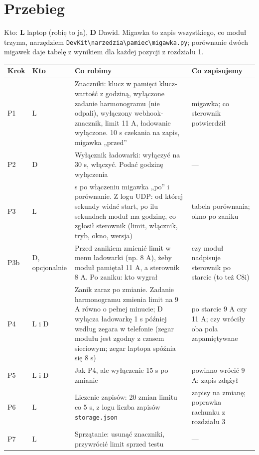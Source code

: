 \documentclass[11pt,a4paper]{article}
\begin{document}
\section*{Przebieg}

Kto: \textbf{L} laptop (robię to ja), \textbf{D} Dawid. Migawka to zapis wszystkiego, co moduł trzyma, narzędziem \texttt{DevKit\textbackslash{}narzedzia\textbackslash{}pamiec\textbackslash{}migawka.\allowbreak{}py}; porównanie dwóch migawek daje tabelę z wynikiem dla każdej pozycji z rozdziału 1.


\begin{longtable}{>{\raggedright\arraybackslash}p{3.00cm}>{\raggedright\arraybackslash}p{1.85cm}>{\raggedright\arraybackslash}p{6.62cm}>{\raggedright\arraybackslash}p{3.36cm}}
\toprule
\rowcolor{apteallight}\textbf{Krok} & \textbf{Kto} & \textbf{Co robimy} & \textbf{Co zapisujemy} \\
\midrule\endhead
\bottomrule\endfoot
P1 & L & Znaczniki: klucz w pamięci klucz-wartość z godziną, wyłączone zadanie harmonogramu (nie odpali), wyłączony webhook-znacznik, limit 11 A, ładowanie wyłączone. 10 s czekania na zapis, migawka „przed” & migawka; co sterownik potwierdził \\
P2 & D & Wyłącznik ładowarki: wyłączyć na 30 s, włączyć. Podać godzinę wyłączenia & — \\
P3 & L & 90 s po włączeniu migawka „po” i porównanie. Z logu UDP: od której sekundy widać start, po ilu sekundach moduł ma godzinę, co zgłosił sterownik (limit, włącznik, tryb, okno, wersja) & tabela porównania; okno po zaniku \\
P3b & D, opcjonalnie & Przed zanikiem zmienić limit w menu ładowarki (np. 8 A), żeby moduł pamiętał 11 A, a sterownik 8 A. Po zaniku: kto wygrał & czy moduł nadpisuje sterownik po starcie (to też C8i) \\
P4 & L i D & Zanik zaraz po zmianie. Zadanie harmonogramu zmienia limit na 9 A równo o pełnej minucie; D wyłącza ładowarkę 1 s później według zegara w telefonie (zegar modułu jest zgodny z czasem sieciowym; zegar laptopa spóźnia się 8 s) & po starcie 9 A czy 11 A; czy wróciły oba pola zapamiętywane \\
P5 & L i D & Jak P4, ale wyłączenie 15 s po zmianie & powinno wrócić 9 A: zapis zdążył \\
P6 & L & Liczenie zapisów: 20 zmian limitu co 5 s, z logu liczba zapisów \texttt{storage.json} & zapisy na zmianę; poprawka rachunku z rozdziału 3 \\
P7 & L & Sprzątanie: usunąć znaczniki, przywrócić limit sprzed testu & — \\
\end{longtable}
\end{document}
